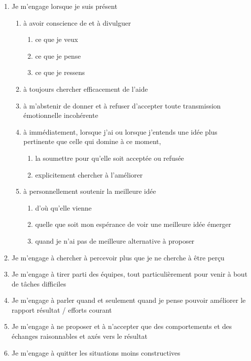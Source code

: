 \documentclass{book}
\begin{document}
\begin{enumerate}
	\item Je m'engage lorsque je suis présent
	\begin{enumerate}
		\item à avoir conscience de et à divulguer
		\begin{enumerate}		
			\item ce que je veux
			\item ce que je pense
			\item ce que je ressens
		\end{enumerate}
		\item à toujours chercher efficacement de l'aide 
		\item à m'abstenir de donner et à refuser d'accepter toute transmission émotionnelle incohérente
		\item à immédiatement, lorsque j'ai ou lorsque j'entends une idée plus pertinente que celle qui domine 
		      à ce moment, 
		\begin{enumerate}		
			\item la soumettre pour qu'elle soit acceptée ou refusée
			\item explicitement chercher à l'améliorer
		\end{enumerate}
		\item à personnellement soutenir la meilleure idée
		\begin{enumerate}		
			\item d'où qu'elle vienne
			\item quelle que soit mon espérance de voir une meilleure idée émerger
			\item quand je n'ai pas de meilleure alternative à proposer
		\end{enumerate}
	\end{enumerate}
	\item Je m'engage à chercher à percevoir plus que je ne cherche à être perçu
	\item Je m'engage à tirer parti des équipes, tout particulièrement pour venir à bout de tâches difficiles
	\item Je m'engage à parler quand et seulement quand je pense pouvoir améliorer le rapport résultat / efforts courant
	\item Je m'engage à ne proposer et à n'accepter que des comportements et des échanges raisonnables et axés vers le résultat
	\item Je m'engage à quitter les situations moins constructives
	\begin{enumerate}

\end{enumerate}
\end{enumerate}
\end{document}
